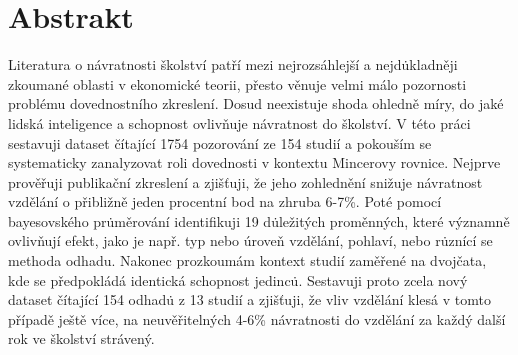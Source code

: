 \documentclass [a4paper,12pt]{report}
\begin{document}
\section*{Abstrakt}

Literatura o n\'{a}vratnosti \v{s}kolstv\'{i} pat\v{r}\'{i} mezi nejrozs\'{a}hlej\v{s}\'{i} a nejd\.{u}kladn\v{e}ji zkouman\'{e} oblasti v ekonomick\'{e} teorii, p\v{r}esto v\v{e}nuje velmi m\'{a}lo pozornosti probl\'{e}mu dovednostn\'{i}ho zkreslen\'{i}. Dosud neexistuje shoda ohledn\v{e} m\'{i}ry, do jak\'{e} lidsk\'{a} inteligence a schopnost ovliv\v{n}uje n\'{a}vratnost do \v{s}kolstv\'{i}. V t\'{e}to pr\'{a}ci sestavuji dataset \v{c}\'{i}taj\'{i}c\'{i} 1754 pozorov\'{a}n\'{i} ze 154 studi\'{i} a pokou\v{s}\'{i}m se systematicky zanalyzovat roli dovednosti v kontextu Mincerovy rovnice. Nejprve prov\v{e}\v{r}uji publika\v{c}n\'{i} zkreslen\'{i} a zji\v{s}\v{t}uji, \v{z}e jeho zohledn\v{e}n\'{i} sni\v{z}uje n\'{a}vratnost vzd\v{e}l\'{a}n\'{i} o p\v{r}ibli\v{z}n\v{e} jeden procentn\'{i} bod na zhruba 6-7\%. Pot\'{e} pomoc\'{i} bayesovsk\'{e}ho pr\.{u}m\v{e}rov\'{a}n\'{i} identifikuji 19 d\.{u}le\v{z}it\'{y}ch prom\v{e}nn\'{y}ch, kter\'{e} v\'{y}znamn\v{e} ovliv\v{n}uj\'{i} efekt, jako je nap\v{r}. typ nebo \'{u}rove\v{n} vzd\v{e}l\'{a}n\'{i}, pohlav\'{i}, nebo r\.{u}zn\'{i}c\'{i} se methoda odhadu. Nakonec prozkoum\'{a}m kontext studi\'{i} zam\v{e}\v{r}en\'{e} na dvoj\v{c}ata, kde se p\v{r}edpokl\'{a}d\'{a} identick\'{a} schopnost jedinc\.{u}. Sestavuji proto zcela nov\'{y} dataset \v{c}\'{i}taj\'{i}c\'{i} 154 odhad\.{u} z 13 studi\'{i} a zji\v{s}\v{t}uji, \v{z}e vliv vzd\v{e}l\'{a}n\'{i} kles\'{a} v tomto p\v{r}\'{i}pad\v{e} je\v{s}t\v{e} v\'{i}ce, na neuv\v{e}\v{r}iteln\'{y}ch 4-6\% n\'{a}vratnosti do vzd\v{e}l\'{a}n\'{i} za ka\v{z}d\'{y} dal\v{s}\'{i} rok ve \v{s}kolstv\'{i} str\'{a}ven\'{y}.
\end{document}
